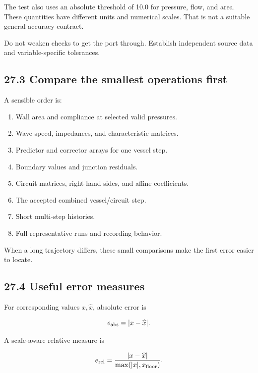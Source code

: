 \documentclass[11pt,a4paper]{article}
\begin{document}
The test also uses an absolute threshold of 10.0 for pressure, flow, and area. These quantities have different units and numerical scales. That is not a suitable general accuracy contract.

Do not weaken checks to get the port through. Establish independent source data and variable-specific tolerances.

\subsection{27.3 Compare the smallest operations first}
A sensible order is:


\begin{enumerate}
\item Wall area and compliance at selected valid pressures.


\item Wave speed, impedances, and characteristic matrices.


\item Predictor and corrector arrays for one vessel step.


\item Boundary values and junction residuals.


\item Circuit matrices, right-hand sides, and affine coefficients.


\item The accepted combined vessel/circuit step.


\item Short multi-step histories.


\item Full representative runs and recording behavior.


\end{enumerate}
When a long trajectory differs, these small comparisons make the first error easier to locate.

\subsection{27.4 Useful error measures}
For corresponding values \(x,\widehat x\), absolute error is


\begingroup\small
\[
e_{\rm abs}=|x-\widehat x|.
\]
\endgroup


A scale-aware relative measure is


\begingroup\small
\[
e_{\rm rel}
=\frac{|x-\widehat x|}{\max(|x|,x_{\rm floor})}.
\]
\endgroup
\end{document}
